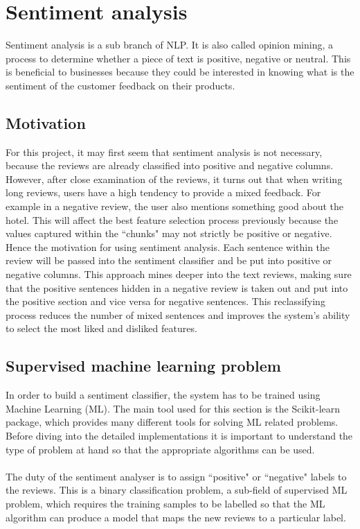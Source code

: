 \documentclass[a4paper]{report}
\begin{document}
\section{Sentiment analysis}
Sentiment analysis is a sub branch of NLP. It is also called opinion mining, a process to determine whether a piece of text is positive, negative or neutral. This is beneficial to businesses because they could be interested in knowing what is the sentiment of the customer feedback on their products. 

\subsection{Motivation}
For this project, it may first seem that sentiment analysis is not necessary, because the reviews are already classified into positive and negative columns. However, after close examination of the reviews, it turns out that when writing long reviews, users have a high tendency to provide a mixed feedback. For example in a negative review, the user also mentions something good about the hotel. This will affect the best feature selection process previously because the values captured within the ``chunks" may not strictly be positive or negative. Hence the motivation for using sentiment analysis. Each sentence within the review will be passed into the sentiment classifier and be put into positive or negative columns. This approach mines deeper into the text reviews, making sure that the positive sentences hidden in a negative review is taken out and put into the positive section and vice versa for negative sentences. This reclassifying process reduces the number of mixed sentences and improves the system's ability to select the most liked and disliked features.

\subsection{Supervised machine learning problem}
In order to build a sentiment classifier, the system has to be trained using Machine Learning (ML). The main tool used for this section is the Scikit-learn package, which provides many different tools for solving ML related problems. Before diving into the detailed implementations it is important to understand the type of problem at hand so that the appropriate algorithms can be used.
\\\\
The duty of the sentiment analyser is to assign ``positive" or ``negative" labels to the reviews. This is a binary classification problem, a sub-field of supervised ML problem, which requires the training samples to be labelled so that the ML algorithm can produce a model that maps the new reviews to a particular label.
\end{document}
